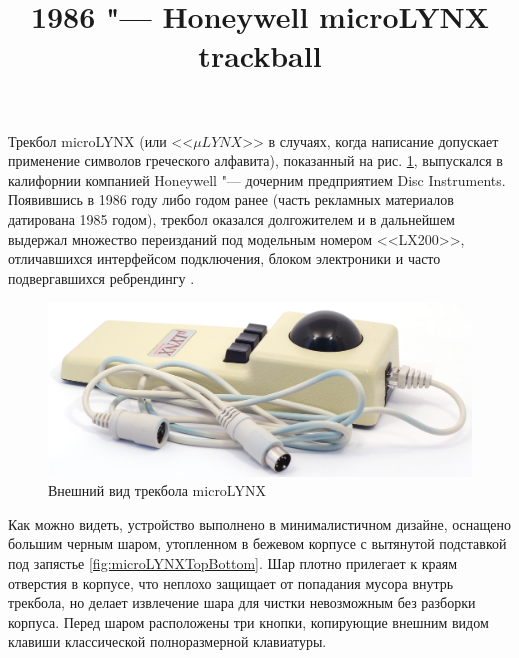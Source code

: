 \documentclass[11pt, a4paper]{article}
\begin{document}
\title{1986 "--- Honeywell microLYNX trackball}
\date{}
\maketitle
{}
Трекбол microLYNX (или <<$\mu LYNX$>> в случаях, когда написание допускает применение символов греческого алфавита), показанный на рис. \ref{fig:microLYNXPic}, выпускался в калифорнии компанией Honeywell "--- дочерним предприятием Disc Instruments. Появившись в 1986 году либо годом ранее (часть рекламных материалов датирована 1985 годом), трекбол оказался долгожителем и в дальнейшем выдержал множество переизданий под модельным номером <<LX200>>, отличавшихся интерфейсом подключения, блоком электроники и часто подвергавшихся ребрендингу \cite{lx200}.


\begin{figure}[h]
    \centering
    \includegraphics[scale=0.45]{1986_honeywell_microlynx_trackball/pic_30.jpg}
    \caption{Внешний вид трекбола microLYNX}
    \label{fig:microLYNXPic}
\end{figure}

Как можно видеть, устройство выполнено в минималистичном дизайне, оснащено большим черным шаром, утопленном в бежевом корпусе с вытянутой подставкой под запястье \ref{fig:microLYNXTopBottom}. Шар плотно прилегает к краям отверстия в корпусе, что неплохо защищает от попадания мусора внутрь трекбола, но делает извлечение шара для чистки невозможным без разборки корпуса. Перед шаром расположены три кнопки, копирующие внешним видом клавиши классической полноразмерной клавиатуры.
\end{document}
